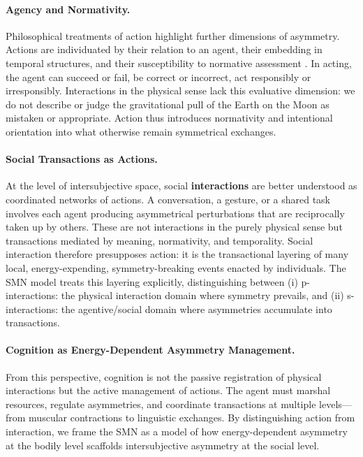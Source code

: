 \paragraph{Agency and Normativity.}  
Philosophical treatments of action highlight further dimensions of asymmetry. Actions are individuated by their relation to an agent, their embedding in temporal structures, and their susceptibility to normative assessment \cite{barandiaran2009defining}. In acting, the agent can succeed or fail, be correct or incorrect, act responsibly or irresponsibly. Interactions in the physical sense lack this evaluative dimension: we do not describe  or judge the gravitational pull of the Earth on the Moon as mistaken or appropriate. Action thus introduces normativity and intentional orientation into what otherwise remain symmetrical exchanges.

\paragraph{Social Transactions as Actions.}  
At the level of intersubjective space, social \textbf{interactions} are better understood as coordinated networks of actions. A conversation, a gesture, or a shared task involves each agent producing asymmetrical perturbations that are reciprocally taken up by others. These are not interactions in the purely physical sense but transactions mediated by meaning, normativity, and temporality. Social interaction therefore presupposes action: it is the transactional layering of many local, energy-expending, symmetry-breaking events enacted by individuals. The SMN model treats this layering explicitly, distinguishing between (i) p-interactions: the physical interaction domain where symmetry prevails, and (ii) s-interactions: the agentive/social domain where asymmetries accumulate into transactions.

\paragraph{Cognition as Energy-Dependent Asymmetry Management.}  
From this perspective, cognition is not the passive registration of physical interactions but the active management of actions. The agent must marshal resources, regulate asymmetries, and coordinate transactions at multiple levels—from muscular contractions to linguistic exchanges. By distinguishing action from interaction, we frame the SMN as a model of how energy-dependent asymmetry at the bodily level scaffolds intersubjective asymmetry at the social level.


